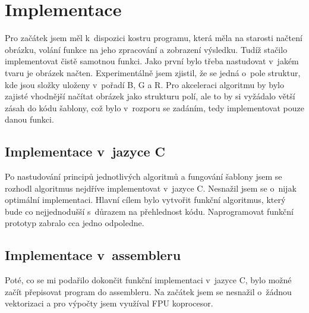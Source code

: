 \documentclass[11pt,a4paper,onecolumn,notitlepage]{article}
\begin{document}
		
\section{Implementace}
	Pro začátek jsem měl k~dispozici kostru programu, která měla na starosti načtení obrázku, volání funkce na jeho zpracování a zobrazení výsledku. Tudíž stačilo implementovat čistě samotnou funkci. Jako první bylo třeba nastudovat v~jakém tvaru je obrázek načten. Experimentálně jsem zjistil, že se jedná o~pole struktur, kde jsou složky uloženy v~pořadí B, G a R. Pro akceleraci algoritmu by bylo zajisté vhodnější načítat obrázek jako strukturu polí, ale to by si vyžádalo větší zásah do kódu šablony, což bylo v~rozporu se zadáním, tedy implementovat pouze danou funkci. 
	
	\subsection{Implementace v~jazyce C}
		Po nastudování principů jednotlivých algoritmů a fungování šablony jsem se rozhodl algoritmus nejdříve implementovat v~jazyce C. Nesnažil jsem se o~nijak optimální implementaci. Hlavní cílem bylo vytvořit funkční algoritmus, který bude co nejjednodušší s~důrazem na přehlednost kódu. Naprogramovat funkční prototyp zabralo cca jedno odpoledne.
		
	\subsection{Implementace v~assembleru}
		Poté, co se mi podařilo dokončit funkční implementaci v~jazyce C, bylo možné začít přepisovat program do assembleru. Na začátek jsem se nesnažil o~žádnou vektorizaci a pro výpočty jsem využíval FPU koprocesor.
		
\end{document}
